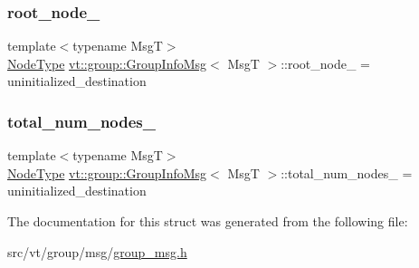 \mbox{\label{structvt_1_1group_1_1_group_info_msg_ab16baeca047c903ab90d90c61b63b991}} 
\subsubsection{\texorpdfstring{root\+\_\+node\+\_\+}{root\_node\_}}
{\footnotesize\ttfamily template$<$typename MsgT$>$ \\
\hyperlink{namespacevt_a866da9d0efc19c0a1ce79e9e492f47e2}{Node\+Type} \hyperlink{structvt_1_1group_1_1_group_info_msg}{vt\+::group\+::\+Group\+Info\+Msg}$<$ MsgT $>$\+::root\+\_\+node\+\_\+ = uninitialized\+\_\+destination\hspace{0.3cm}{\ttfamily [private]}}

\mbox{\label{structvt_1_1group_1_1_group_info_msg_a1486c52bc955ec3a91fff0628a8212a9}} 
\subsubsection{\texorpdfstring{total\+\_\+num\+\_\+nodes\+\_\+}{total\_num\_nodes\_}}
{\footnotesize\ttfamily template$<$typename MsgT$>$ \\
\hyperlink{namespacevt_a866da9d0efc19c0a1ce79e9e492f47e2}{Node\+Type} \hyperlink{structvt_1_1group_1_1_group_info_msg}{vt\+::group\+::\+Group\+Info\+Msg}$<$ MsgT $>$\+::total\+\_\+num\+\_\+nodes\+\_\+ = uninitialized\+\_\+destination\hspace{0.3cm}{\ttfamily [private]}}



The documentation for this struct was generated from the following file\+:\begin{DoxyCompactItemize}
\item 
src/vt/group/msg/\hyperlink{group__msg_8h}{group\+\_\+msg.\+h}\end{DoxyCompactItemize}

